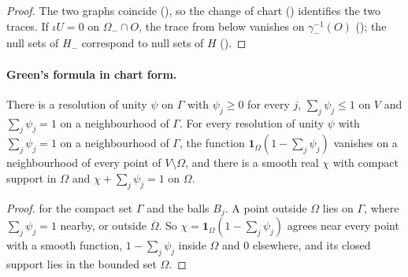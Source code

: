 \begin{proof}
\leanok
The two graphs coincide (), so the change of chart
() identifies the two traces. If $\iota U = 0$ on $\Omega_- \cap O$, the
trace from below vanishes on $\gamma_-^{-1}(O)$ (); the null sets of
$H_-$ correspond to null sets of $H$ ().
\end{proof}

\paragraph{Green's formula in chart form.}

\begin{lemma}
\label{lem:boundary-partition-nhds}
\leanok
{}
There is a resolution of unity $\psi$ on $\Gamma$ with $\psi_j \geq 0$ for every $j$,
$\sum_j \psi_j \leq 1$ on $V$ and $\sum_j \psi_j = 1$ on a neighbourhood of $\Gamma$. For every
resolution of unity $\psi$ with $\sum_j \psi_j = 1$ on a neighbourhood of $\Gamma$, the function
$\mathbf 1_\Omega (1 - \sum_j \psi_j)$ vanishes on a neighbourhood of every point of
$V \setminus \Omega$, and there is a smooth real $\chi$ with compact support in $\Omega$ and
$\chi + \sum_j \psi_j = 1$ on $\Omega$.
\end{lemma}

\begin{proof}
\leanok
{} for the compact set $\Gamma$ and the balls $B_j$. A point outside
$\Omega$ lies on $\Gamma$, where $\sum_j \psi_j = 1$ nearby, or outside
$\overline\Omega$. So $\chi = \mathbf 1_\Omega (1 - \sum_j \psi_j)$ agrees near every point with
a smooth function, $1 - \sum_j \psi_j$ inside $\Omega$ and $0$ elsewhere, and its closed support
lies in the bounded set $\Omega$.
\end{proof}

